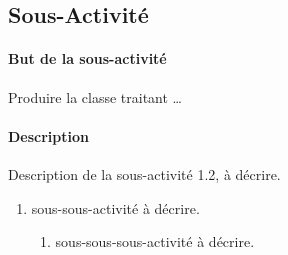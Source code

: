 

\subsection{Sous-Activit\'{e}} \label{act12}
\paragraph{But de la sous-activit\'{e}}
Produire la classe  traitant \ldots
\paragraph{Description}
Description de la sous-activit\'{e} 1.2, \`{a} d\'{e}crire.

\begin{enumerate}
    \item sous-sous-activit\'{e} \`{a} d\'{e}crire.
    \begin{enumerate}
    \item sous-sous-sous-activit\'{e} \`{a} d\'{e}crire.
    \end{enumerate}
\end{enumerate}
